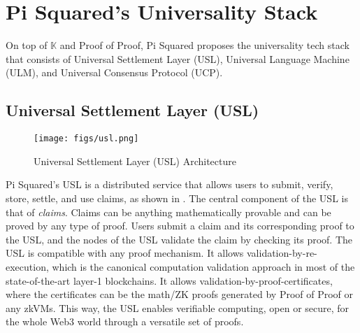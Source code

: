\documentclass{article}
\newcommand{\K}{\ensuremath{\mathbb{K}}\xspace}
\begin{document}
\section{Pi Squared's Universality Stack}

On top of \K and Proof of Proof,
Pi Squared proposes the universality tech stack that consists of 
Universal Settlement Layer (USL),
Universal Language Machine (ULM),
and Universal Consensus Protocol (UCP). 

\subsection{Universal Settlement Layer (USL)}

\begin{figure}
\centering
\texttt{[image: figs/usl.png]}
\caption{Universal Settlement Layer (USL) Architecture}
\label{fig:usl}
\end{figure}

Pi Squared's USL is a distributed service that allows users to submit, verify, store, settle, and use claims,
as shown in .
The central component of the USL is that of \emph{claims}. 
Claims can be anything mathematically provable and can be proved by any type of proof.
Users submit a claim and 
its corresponding proof to the USL, and the nodes of the USL validate the claim by checking its proof.
The USL is compatible with any proof mechanism. 
It allows validation-by-re-execution, which is the canonical computation validation approach in most of the state-of-the-art layer-1 blockchains. 
It allows validation-by-proof-certificates, where the certificates
can be the math/ZK proofs generated by Proof of Proof or any zkVMs. 
This way, the USL enables verifiable computing, 
open or secure, for the whole Web3 world through a versatile set of proofs.
\end{document}

